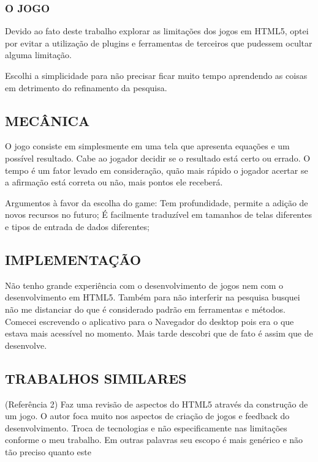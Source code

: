 \documentclass[11pt,a4paper]{article}
\begin{document}
\subsubsection{O JOGO}

Devido ao fato deste trabalho explorar as limitações dos jogos em
HTML5, optei por evitar a utilização de plugins e ferramentas de
terceiros que pudessem ocultar alguma limitação.

Escolhi a simplicidade para não precisar ficar muito tempo aprendendo
as coisas em detrimento do refinamento da pesquisa.

\subsection{MECÂNICA}

O jogo consiste em simplesmente em uma tela que apresenta equações e
um possível resultado. Cabe ao jogador decidir se o resultado está
certo ou errado. O tempo é um fator levado em consideração, quão
mais rápido o jogador acertar se a afirmação está correta ou não,
mais pontos ele receberá.

Argumentos à favor da escolha do game: Tem profundidade, permite a
adição de novos recursos no futuro;
É facilmente traduzível em tamanhos de telas diferentes e tipos de
entrada de dados diferentes;

\subsection{IMPLEMENTAÇÃO}

Não tenho grande experiência com o desenvolvimento de jogos nem com
o desenvolvimento em HTML5. Também para não interferir na pesquisa
busquei não me distanciar do que é considerado padrão em ferramentas
e métodos.
Comecei escrevendo o aplicativo para o Navegador do desktop pois era o
que estava mais acessível no momento. Mais tarde descobri que de fato
é assim que de desenvolve.

\subsection{ TRABALHOS SIMILARES}

(Referência 2) Faz uma revisão de aspectos do HTML5 através da
construção de um jogo. O autor foca muito nos aspectos de criação
de jogos e feedback do desenvolvimento. Troca de tecnologias e não
especificamente nas limitações conforme o meu trabalho. Em outras
palavras seu escopo é mais genérico e não tão preciso quanto este
\end{document}
